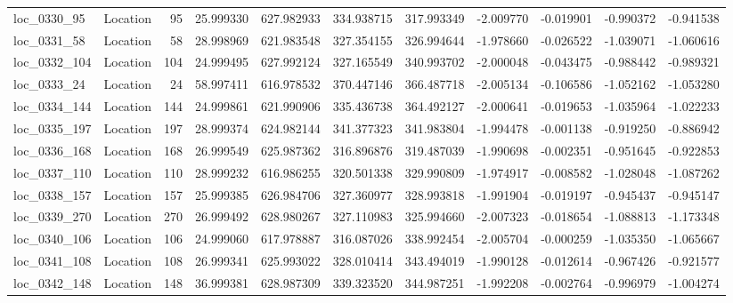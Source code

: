 \begin{tabular}{llrrrrrrrrr}
  loc_0330_95 &        Location &              95 &  25.999330 & 627.982933 &  334.938715 &    317.993349 &  -2.009770 &  -0.019901 &   -0.990372 &     -0.941538 \\
  loc_0331_58 &        Location &              58 &  28.998969 & 621.983548 &  327.354155 &    326.994644 &  -1.978660 &  -0.026522 &   -1.039071 &     -1.060616 \\
 loc_0332_104 &        Location &             104 &  24.999495 & 627.992124 &  327.165549 &    340.993702 &  -2.000048 &  -0.043475 &   -0.988442 &     -0.989321 \\
  loc_0333_24 &        Location &              24 &  58.997411 & 616.978532 &  370.447146 &    366.487718 &  -2.005134 &  -0.106586 &   -1.052162 &     -1.053280 \\
 loc_0334_144 &        Location &             144 &  24.999861 & 621.990906 &  335.436738 &    364.492127 &  -2.000641 &  -0.019653 &   -1.035964 &     -1.022233 \\
 loc_0335_197 &        Location &             197 &  28.999374 & 624.982144 &  341.377323 &    341.983804 &  -1.994478 &  -0.001138 &   -0.919250 &     -0.886942 \\
 loc_0336_168 &        Location &             168 &  26.999549 & 625.987362 &  316.896876 &    319.487039 &  -1.990698 &  -0.002351 &   -0.951645 &     -0.922853 \\
 loc_0337_110 &        Location &             110 &  28.999232 & 616.986255 &  320.501338 &    329.990809 &  -1.974917 &  -0.008582 &   -1.028048 &     -1.087262 \\
 loc_0338_157 &        Location &             157 &  25.999385 & 626.984706 &  327.360977 &    328.993818 &  -1.991904 &  -0.019197 &   -0.945437 &     -0.945147 \\
 loc_0339_270 &        Location &             270 &  26.999492 & 628.980267 &  327.110983 &    325.994660 &  -2.007323 &  -0.018654 &   -1.088813 &     -1.173348 \\
 loc_0340_106 &        Location &             106 &  24.999060 & 617.978887 &  316.087026 &    338.992454 &  -2.005704 &  -0.000259 &   -1.035350 &     -1.065667 \\
 loc_0341_108 &        Location &             108 &  26.999341 & 625.993022 &  328.010414 &    343.494019 &  -1.990128 &  -0.012614 &   -0.967426 &     -0.921577 \\
 loc_0342_148 &        Location &             148 &  36.999381 & 628.987309 &  339.323520 &    344.987251 &  -1.992208 &  -0.002764 &   -0.996979 &     -1.004274 \\

\end{tabular}
